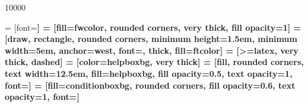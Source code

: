 \setlength{\intextsep}{25pt}

 10000 %
\raggedbottom

\usepackage{tikz}
\usetikzlibrary{arrows, positioning, fit, backgrounds, calc}

\usepackage{pgfplots}
\pgfplotsset{compat=newest}




 = [font=\bf\ttfamily]
 = [fill=fwcolor, rounded corners, very thick, fill opacity=1]
 = [draw, rectangle, rounded corners, minimum height=1.5em, minimum width=5em, anchor=west, font=\footnotesize\ttfamily, thick, fill=ftcolor]
 = [>=latex, very thick, dashed]
 = [color=helpboxbg, very thick]
 = [fill, rounded corners, text width=12.5em, fill=helpboxbg, fill opacity=0.5, text opacity=1, font=\small]
 = [fill=conditionboxbg, rounded corners, fill opacity=0.6, text opacity=1, font=\footnotesize]



\usepackage{hyperref}
\hypersetup{
    colorlinks=true,
    linkcolor=black,
    filecolor=magenta,      
    urlcolor=blue,
}


\usepackage{ifthen}


\newcommand\ddfrac[2]{\frac{\displaystyle #1}{\displaystyle #2}}

\newcommand{\tocite}{\todo{Citation\\Needed}}


\newcommand{\code}[1]{\texttt{\hl{#1}}}
\newcommand{\link}[2] {\hyperref[#1]{\textcolor{link}{#2}}}
\newcommand{\firetask}[1] {\hyperref[automation:sec-#1]{\textcolor{black}{\texttt{#1}}}}
\newcommand{\vasp}[1] {\hyperref[appendix:sec-#1]{\textcolor{link}{\texttt{#1}}}}
 
